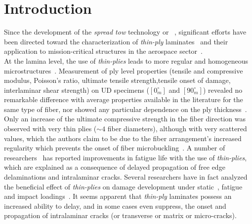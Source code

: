 \documentclass[review]{elsarticle}
\begin{document}
\linenumbers


\section{Introduction}

Since the development of the \emph{spread tow} technology or ~\cite{Kawabe2008,Kawabe2008en}, significant efforts have been directed toward the characterization of \emph{thin-ply} laminates~\cite{Sasayama2003,Yamaguchi2005,Tsai2005,Sihn2007,Yokozeki2008,Yokozeki2010,Saito2012,Arteiro2013,Arteiro2014,Amacher2014,Guillamet2014,Huang2018,Cugnoni2018} and their application to mission-critical structures in the aerospace sector~\cite{Moon2011,Kim2017,Kopp2017,McCarville2018}.\\
At the lamina level, the use of \emph{thin-plies} leads to more regular and homogeneous microstructures~\cite{Saito2012,Amacher2014}. Measurement of ply level properties (tensile and compressive modulus, Poisson's ratio, ultimate tensile strength,tensile onset of damage, interlaminar shear strength) on UD specimens ($\left[0_{m}^{\circ}\right]$ and $\left[90_{m}^{\circ}\right]$) revealed no remarkable difference with average properties available in the literature for the same type of fiber, nor showed any particular dependence on the ply thickness~\cite{Amacher2014}. Only an increase of the ultimate compressive strength in the fiber direction was observed with very thin plies ($\sim4$ fiber diameters), although with very scattered values, which the authors claim to be due to the fiber arrangement's increased regularity which prevents the onset of fiber microbuckling~\cite{Amacher2014}. A number of researchers~\cite{Yamaguchi2005,Tsai2005,Sihn2007,Yokozeki2008} has reported improvements in fatigue life with the use of \emph{thin-plies}, which are explained as a consequence of delayed propagation of free edge delaminations and intralaminar cracks. Several researchers have in fact analyzed the beneficial effect of \emph{thin-plies} on damage development under static~\cite{Sasayama2003,Sihn2007,Yokozeki2008,Yokozeki2010,Saito2012,Arteiro2013,Arteiro2014,Amacher2014}, fatigue~\cite{Yamaguchi2005,Sihn2007,Yokozeki2008,Yokozeki2010,Amacher2014} and impact loadings~\cite{Sihn2007,Yokozeki2008,Yokozeki2010,Amacher2014}. It seems apparent that \emph{thin-ply} laminates possess an increased ability to delay, and in some cases even suppress, the onset and propagation of intralaminar cracks (or transverse or matrix or micro-cracks).\\
\end{document}
